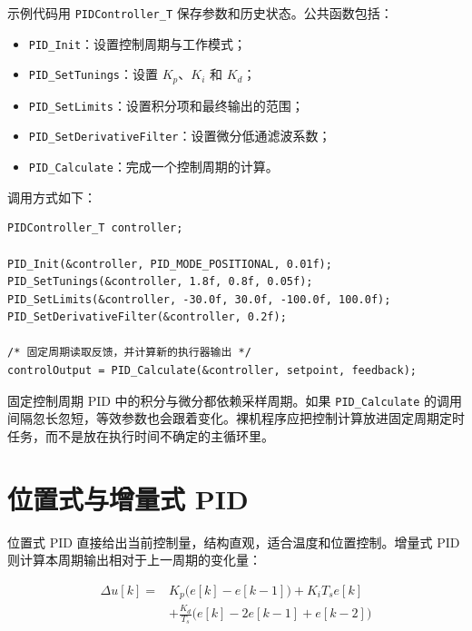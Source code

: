 示例代码用 \texttt{PIDController\_T} 保存参数和历史状态。公共函数包括：

\begin{itemize}
\item \texttt{PID\_Init}：设置控制周期与工作模式；
\item \texttt{PID\_SetTunings}：设置 $K_p$、$K_i$ 和 $K_d$；
\item \texttt{PID\_SetLimits}：设置积分项和最终输出的范围；
\item \texttt{PID\_SetDerivativeFilter}：设置微分低通滤波系数；
\item \texttt{PID\_Calculate}：完成一个控制周期的计算。
\end{itemize}

调用方式如下：

\begin{lstlisting}[style=c]
PIDController_T controller;

PID_Init(&controller, PID_MODE_POSITIONAL, 0.01f);
PID_SetTunings(&controller, 1.8f, 0.8f, 0.05f);
PID_SetLimits(&controller, -30.0f, 30.0f, -100.0f, 100.0f);
PID_SetDerivativeFilter(&controller, 0.2f);

/* 固定周期读取反馈，并计算新的执行器输出 */
controlOutput = PID_Calculate(&controller, setpoint, feedback);
\end{lstlisting}

\begin{anybox}{固定控制周期}
PID 中的积分与微分都依赖采样周期。如果 \texttt{PID\_Calculate} 的调用间隔忽长忽短，等效参数也会跟着变化。裸机程序应把控制计算放进固定周期定时任务，而不是放在执行时间不确定的主循环里。
\end{anybox}

\section{位置式与增量式 PID}

位置式 PID 直接给出当前控制量，结构直观，适合温度和位置控制。增量式 PID 则计算本周期输出相对于上一周期的变化量：

\begin{equation}
\begin{aligned}
\Delta u[k]={}&K_p\bigl(e[k]-e[k-1]\bigr)+K_iT_se[k]\\
&+\frac{K_d}{T_s}\bigl(e[k]-2e[k-1]+e[k-2]\bigr)
\end{aligned}
\label{eq:pid-increment}
\end{equation}


